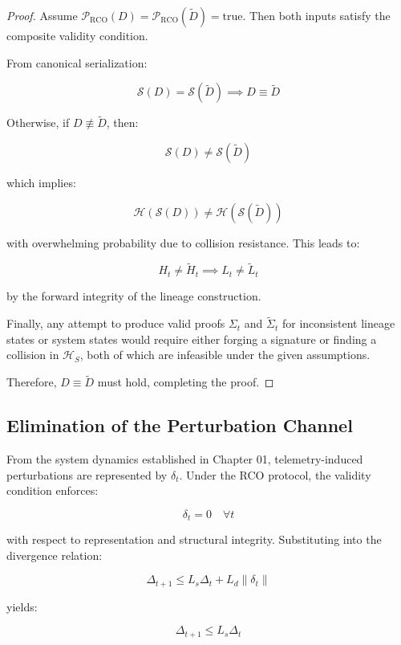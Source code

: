 \begin{proof}
Assume $\mathcal{P}_{\text{RCO}}(D) = \mathcal{P}_{\text{RCO}}(\tilde{D}) = \text{true}$. Then both inputs satisfy the composite validity condition.

From canonical serialization:

\[
\mathcal{S}(D) = \mathcal{S}(\tilde{D}) \implies D \equiv \tilde{D}
\]

Otherwise, if $D \not\equiv \tilde{D}$, then:

\[
\mathcal{S}(D) \neq \mathcal{S}(\tilde{D})
\]

which implies:

\[
\mathcal{H}(\mathcal{S}(D)) \neq \mathcal{H}(\mathcal{S}(\tilde{D}))
\]

with overwhelming probability due to collision resistance. This leads to:

\[
H_t \neq \tilde{H}_t \implies L_t \neq \tilde{L}_t
\]

by the forward integrity of the lineage construction.

Finally, any attempt to produce valid proofs $\Sigma_t$ and $\tilde{\Sigma}_t$ for inconsistent lineage states or system states would require either forging a signature or finding a collision in $\mathcal{H}_S$, both of which are infeasible under the given assumptions.

Therefore, $D \equiv \tilde{D}$ must hold, completing the proof.
\end{proof}

\subsection{Elimination of the Perturbation Channel}

From the system dynamics established in Chapter 01, telemetry-induced perturbations are represented by $\delta_t$. Under the RCO protocol, the validity condition enforces:

\begin{equation}
\delta_t = 0 \quad \forall t
\end{equation}

with respect to representation and structural integrity. Substituting into the divergence relation:

\begin{equation}
\Delta_{t+1} \leq L_s \Delta_t + L_d \|\delta_t\|
\end{equation}

yields:

\begin{equation}
\Delta_{t+1} \leq L_s \Delta_t
\end{equation}

